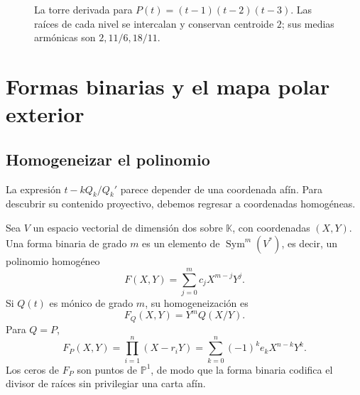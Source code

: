 \documentclass[11pt,oneside]{scrartcl}
\theoremstyle{plainblue}
\theoremstyle{definitionblue}
\theoremstyle{remarkgray}
\newcommand{\KK}{\mathbb{K}}
\newcommand{\PP}{\mathbb{P}}
\newcommand{\Sym}{\operatorname{Sym}}
\begin{document}
\begin{figure}[ht]
\centering
{}
\caption{La torre derivada para \(P(t)=(t-1)(t-2)(t-3)\). Las raíces de cada nivel se intercalan y conservan centroide \(2\); sus medias armónicas son \(2,11/6,18/11\).}
\label{fig:cubic-example-tower}
\end{figure}


\section{Formas binarias y el mapa polar exterior}

\subsection{Homogeneizar el polinomio}

La expresión \(t-kQ_k/Q_k'\) parece depender de una coordenada afín. Para descubrir
su contenido proyectivo, debemos regresar a coordenadas homogéneas.

Sea \(V\) un espacio vectorial de dimensión dos sobre \(\KK\), con coordenadas
\((X,Y)\). Una forma binaria de grado \(m\) es un elemento de
\(\Sym^m(V^*)\), es decir, un polinomio homogéneo
\[
F(X,Y)=\sum_{j=0}^{m}c_jX^{m-j}Y^j.
\]
Si \(Q(t)\) es mónico de grado \(m\), su homogeneización es
\begin{equation}\label{eq:homogenization}
F_Q(X,Y)=Y^mQ(X/Y).
\end{equation}
Para \(Q=P\),
\begin{equation}\label{eq:F-P}
F_P(X,Y)=\prod_{i=1}^{n}(X-r_iY)
=\sum_{k=0}^{n}(-1)^ke_kX^{n-k}Y^k.
\end{equation}
Los ceros de \(F_P\) son puntos de \(\PP^1\), de modo que la forma binaria codifica
el divisor de raíces sin privilegiar una carta afín.
\end{document}
